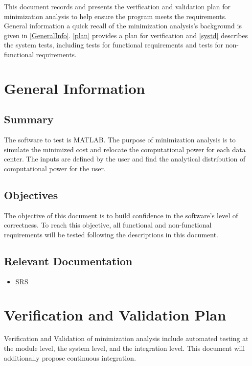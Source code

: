 \documentclass[12pt, titlepage]{article}
\begin{document}

This document records and presents the verification and validation plan for minimization analysis
to help ensure the program meets the requirements. General information a quick recall of the minimization analysis’s background is given in \autoref{GeneralInfo}. 
\autoref{plan} provides a plan for verification and \autoref{systd} describes 
the system tests, including tests for functional requirements and tests for non-functional requirements.
\newpage

\section{General Information}
\label{GeneralInfo}

\subsection{Summary}

The software to test is MATLAB. The purpose of minimization analysis is to simulate the minimized cost and relocate the computational power for each data center. The inputs are defined by the user and find the analytical distribution of computational power for the user.

\subsection{Objectives}

The objective of this document is to build confidence in the software's level of correctness. To reach this objective, all functional and non-functional requirements will be tested following the descriptions in this document.

\subsection{Relevant Documentation}

\begin{itemize}
	\item 
	\href{https://github.com/XingzhiMac/CAS741-Proj/blob/master/docs/SRS/SRS.pdf}
	{SRS} 
\end{itemize}

\section{Verification and Validation Plan}\label{plan}
Verification and Validation of minimization analysis include automated testing at the module level, the system level, and the integration level. This document will additionally propose continuous integration.	
\end{document}
